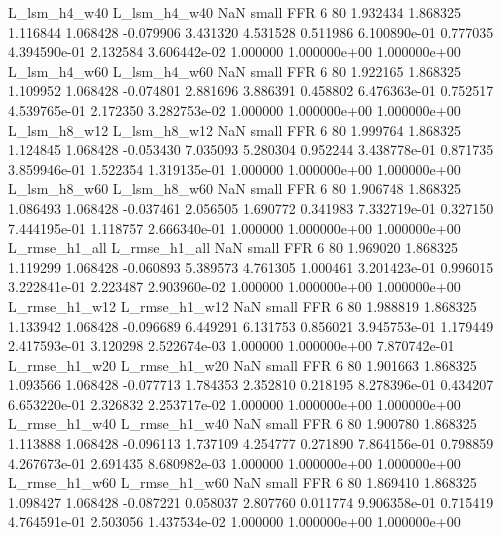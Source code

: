  L_lsm_h4_w40   L_lsm_h4_w40                   NaN      small      FFR                 6 80 1.932434       1.868325 1.116844       1.068428   -0.079906      3.431320      4.531528     0.511986   6.100890e-01  0.777035 4.394590e-01     2.132584   3.606442e-02            1.000000    1.000000e+00        1.000000e+00
  L_lsm_h4_w60   L_lsm_h4_w60                   NaN      small      FFR                 6 80 1.922165       1.868325 1.109952       1.068428   -0.074801      2.881696      3.886391     0.458802   6.476363e-01  0.752517 4.539765e-01     2.172350   3.282753e-02            1.000000    1.000000e+00        1.000000e+00
  L_lsm_h8_w12   L_lsm_h8_w12                   NaN      small      FFR                 6 80 1.999764       1.868325 1.124845       1.068428   -0.053430      7.035093      5.280304     0.952244   3.438778e-01  0.871735 3.859946e-01     1.522354   1.319135e-01            1.000000    1.000000e+00        1.000000e+00
  L_lsm_h8_w60   L_lsm_h8_w60                   NaN      small      FFR                 6 80 1.906748       1.868325 1.086493       1.068428   -0.037461      2.056505      1.690772     0.341983   7.332719e-01  0.327150 7.444195e-01     1.118757   2.666340e-01            1.000000    1.000000e+00        1.000000e+00
 L_rmse_h1_all  L_rmse_h1_all                   NaN      small      FFR                 6 80 1.969020       1.868325 1.119299       1.068428   -0.060893      5.389573      4.761305     1.000461   3.201423e-01  0.996015 3.222841e-01     2.223487   2.903960e-02            1.000000    1.000000e+00        1.000000e+00
 L_rmse_h1_w12  L_rmse_h1_w12                   NaN      small      FFR                 6 80 1.988819       1.868325 1.133942       1.068428   -0.096689      6.449291      6.131753     0.856021   3.945753e-01  1.179449 2.417593e-01     3.120298   2.522674e-03            1.000000    1.000000e+00        7.870742e-01
 L_rmse_h1_w20  L_rmse_h1_w20                   NaN      small      FFR                 6 80 1.901663       1.868325 1.093566       1.068428   -0.077713      1.784353      2.352810     0.218195   8.278396e-01  0.434207 6.653220e-01     2.326832   2.253717e-02            1.000000    1.000000e+00        1.000000e+00
 L_rmse_h1_w40  L_rmse_h1_w40                   NaN      small      FFR                 6 80 1.900780       1.868325 1.113888       1.068428   -0.096113      1.737109      4.254777     0.271890   7.864156e-01  0.798859 4.267673e-01     2.691435   8.680982e-03            1.000000    1.000000e+00        1.000000e+00
 L_rmse_h1_w60  L_rmse_h1_w60                   NaN      small      FFR                 6 80 1.869410       1.868325 1.098427       1.068428   -0.087221      0.058037      2.807760     0.011774   9.906358e-01  0.715419 4.764591e-01     2.503056   1.437534e-02            1.000000    1.000000e+00        1.000000e+00
